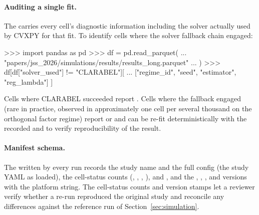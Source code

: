 \documentclass[article]{jss}
\begin{document}
\begin{appendix}
\paragraph{Auditing a single fit.}
The  carries every cell's diagnostic
information including the solver actually used by CVXPY for that
fit. To identify cells where the solver fallback chain engaged:
%
\begin{CodeChunk}
	\begin{CodeInput}
>>> import pandas as pd
>>> df = pd.read_parquet(
...     "papers/jss_2026/simulations/results/results_long.parquet"
... )
>>> df[df["solver_used"] != "CLARABEL"][
...     ["regime_id", "seed", "estimator", "reg_lambda"] ]
	\end{CodeInput}
\end{CodeChunk}
%
Cells where CLARABEL succeeded report .
Cells where the fallback engaged (rare in practice, observed in
approximately one cell per several thousand on the orthogonal factor
regime) report  or  and can be re-fit
deterministically with the recorded  and 
to verify reproducibility of the result.

\paragraph{Manifest schema.}
The  written by every run records the study name
and the full config (the study YAML as loaded), the cell-status counts
(, , ,
),  and
, and the , ,
, and  versions with the platform string. The
cell-status counts and version stamps let a reviewer verify whether a
re-run reproduced the original study and reconcile any differences
against the reference run of Section~\ref{sec:simulation}.


\end{appendix}
\end{document}
